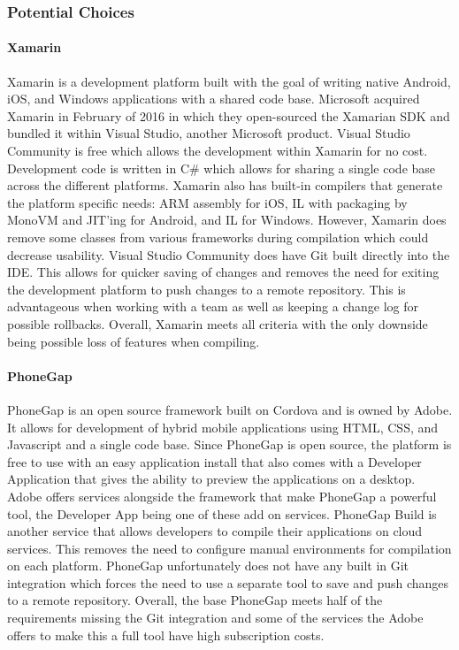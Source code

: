 \documentclass[onecolumn, draftclsnofoot,10pt, compsoc]{IEEEtran}
\begin{document}
\subsubsection{Potential Choices}
\paragraph{Xamarin}

Xamarin is a development platform built with the goal of writing native Android, iOS, and Windows applications with a shared code base. Microsoft acquired Xamarin 
in February of 2016 in which they open-sourced the Xamarian SDK and bundled it within Visual Studio, another Microsoft product. Visual Studio Community is free
which allows the development within Xamarin for no cost. Development code is written in C\# which allows for sharing a single code base across the different platforms.
Xamarin also has built-in compilers that generate the platform specific needs: ARM assembly for iOS, IL with packaging by MonoVM and JIT'ing for Android, and IL for Windows.
However, Xamarin does remove some classes from various frameworks during compilation which could decrease usability. Visual Studio Community does have Git built directly into the IDE.
This allows for quicker saving of changes and removes the need for exiting the development platform to push changes to a remote repository. This is advantageous when working with
a team as well as keeping a change log for possible rollbacks. Overall, Xamarin meets all criteria with the only downside being possible loss of features when compiling.

\paragraph{PhoneGap}

PhoneGap is an open source framework built on Cordova and is owned by Adobe. It allows for development of hybrid mobile applications using HTML, CSS, and Javascript and a single code base.
Since PhoneGap is open source, the platform is free to use with an easy application install that also comes with a Developer Application that gives the ability to preview the applications on a desktop.
Adobe offers services alongside the framework that make PhoneGap a powerful tool, the Developer App being one of these add on services. PhoneGap Build is another service that allows developers to
compile their applications on cloud services. This removes the need to configure manual environments for compilation on each platform. PhoneGap unfortunately does not have any built in Git integration
which forces the need to use a separate tool to save and push changes to a remote repository. Overall, the base PhoneGap meets half of the requirements missing the Git integration and some
of the services the Adobe offers to make this a full tool have high subscription costs.
\end{document}
